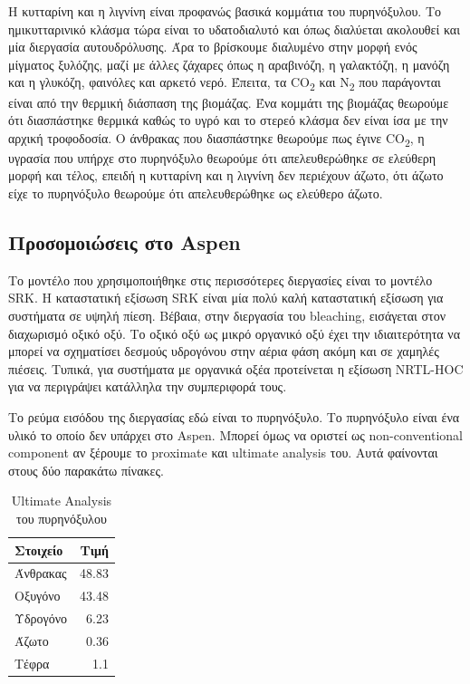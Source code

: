 \documentclass[11pt]{article}
\begin{document}
Η κυτταρίνη και η λιγνίνη είναι προφανώς βασικά κομμάτια του πυρηνόξυλου. Το ημικυτταρινικό κλάσμα τώρα είναι το υδατοδιαλυτό και όπως διαλύεται ακολουθεί και μία διεργασία αυτουδρόλυσης. Άρα το βρίσκουμε διαλυμένο στην μορφή ενός μίγματος ξυλόζης, μαζί με άλλες ζάχαρες όπως η αραβινόζη, η γαλακτόζη, η μανόζη και η γλυκόζη, φαινόλες και αρκετό νερό. Έπειτα, τα CO\textsubscript{2} και N\textsubscript{2} που παράγονται είναι από την θερμική διάσπαση της βιομάζας. Ένα κομμάτι της βιομάζας θεωρούμε ότι διασπάστηκε θερμικά καθώς το υγρό και το στερεό κλάσμα δεν είναι ίσα με την αρχική τροφοδοσία. Ο άνθρακας που διασπάστηκε θεωρούμε πως έγινε CO\textsubscript{2}, η υγρασία που υπήρχε στο πυρηνόξυλο θεωρούμε ότι απελευθερώθηκε σε ελεύθερη μορφή και τέλος, επειδή η κυτταρίνη και η λιγνίνη δεν περιέχουν άζωτο, ότι άζωτο είχε το πυρηνόξυλο θεωρούμε ότι απελευθερώθηκε ως ελεύθερο άζωτο.

\subsection{Προσομοιώσεις στο Aspen}
\label{sec:org966d25e}
Το μοντέλο που χρησιμοποιήθηκε στις περισσότερες διεργασίες είναι το μοντέλο SRK. Η καταστατική εξίσωση SRK είναι μία πολύ καλή καταστατική εξίσωση για συστήματα σε υψηλή πίεση. Βέβαια, στην διεργασία του bleaching, εισάγεται στον διαχωρισμό οξικό οξύ. Το οξικό οξύ ως μικρό οργανικό οξύ έχει την ιδιαιτερότητα να μπορεί να σχηματίσει δεσμούς υδρογόνου στην αέρια φάση ακόμη και σε χαμηλές πιέσεις. Τυπικά, για συστήματα με οργανικά οξέα προτείνεται η εξίσωση NRTL-HOC για να περιγράψει κατάλληλα την συμπεριφορά τους.

Το ρεύμα εισόδου της διεργασίας εδώ είναι το πυρηνόξυλο. Το πυρηνόξυλο είναι ένα υλικό το οποίο δεν υπάρχει στο Aspen. Μπορεί όμως να οριστεί ως non-conventional component αν ξέρουμε το proximate και ultimate analysis του. Αυτά φαίνονται στους δύο παρακάτω πίνακες.

\begin{table}[htbp]
\caption{Ultimate Analysis του πυρηνόξυλου}
\centering
\begin{tabular}{lr}
Στοιχείο & Τιμή\\
\hline
Άνθρακας & 48.83\\
Οξυγόνο & 43.48\\
Υδρογόνο & 6.23\\
Άζωτο & 0.36\\
Τέφρα & 1.1\\
\end{tabular}
\end{table}
\end{document}

